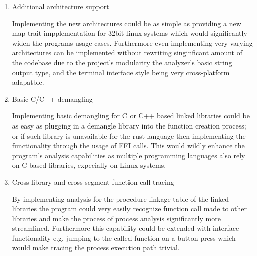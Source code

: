 \begin{enumerate}
    \item{Additional architecture support}

    Implementing the new architectures could be as simple as providing a new map trait impplementation for 32bit linux systems which would significantly widen the programs usage cases.
    Furthermore even implementing very varying architectures can be implemented without rewriting singinficant amount of the codebase due to the project's modularity the analyzer's basic string output type, and the terminal interface style being very cross-platform adapatble.
    
    \item {Basic C/C++ demangling}

    Implementing basic demangling for C or C++ based linked libraries could be as easy as plugging in a demangle library into the function creation process; or if such library is unavailable for the rust language then implementing the functionality through the usage of FFI calls.
    This would wildly enhance the program's analysis capabilities as multiple programming languages also rely on C based libraries, expecially on Linux systems.

    \item {Cross-library and cross-segment function call tracing}

    By implementing analysis for the procedure linkage table of the linked libraries the program could very easily recognize function call made to other libraries and make the process of process analysis significantly more streamlined.
    Furthermore this capability could be extended with interface functionality e.g. jumping to the called function on a button press which would make tracing the process execution path trivial.
    
\end{enumerate}
